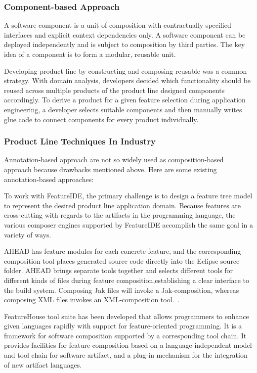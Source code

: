 \subsubsection{Component-based Approach}

A software component is a unit of composition with contractually
specified interfaces and explicit context dependencies only. A software
component can be deployed independently and is subject to composition by
third parties. The key idea of a component is to form a modular,
reusable unit.

Developing product line by constructing and composing reusable was a
common strategy. With domain analysis, developers decided which
functionality should be reused across multiple products of the product
line designed components accordingly. To derive a product for a given
feature selection during application engineering, a developer selects
suitable components and then manually writes glue code to connect
components for every product individually.



\subsubsection{Product Line Techniques In Industry}

Annotation-based approach are not so widely used as composition-based
approach because drawbacks mentioned above. Here are some existing
annotation-based approaches:




To work with FeatureIDE, the primary challenge is to design a feature
tree model to represent the desired product line application domain.
Because features are cross-cutting with regards to the artifacts in the
programming language, the various composer engines supported by
FeatureIDE accomplish the same goal in a variety of ways.

AHEAD has feature modules for each concrete feature, and the
corresponding composition tool places generated source code directly
into the Eclipse source folder. AHEAD brings separate tools together and
selects different tools for different kinds of files during feature
composition,establishing a clear interface to the build system.
Composing Jak files will invoke a Jak-composition, whereas composing XML
files invokes an XML-composition
tool.~\cite{Batory2004FeatureorientedPA}.

FeatureHouse tool suite has been developed that allows programmers to
enhance given languages rapidly with support for feature-oriented
programming. It is a framework for software composition supported by a
corresponding tool chain. It provides facilities for feature composition
based on a language-independent model and tool chain for software
artifact, and a plug-in mechanism for the integration of new artifact
languages.~\cite{Apel:2009:FLA:1555001.1555038}

